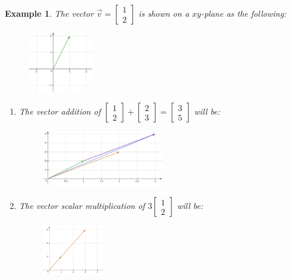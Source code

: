 \documentclass[12pt, a4paper]{article}
\newtheorem{eg}{Example}[subsection]
\begin{document}
\begin{eg}
The vector $\vec{v}=\begin{bmatrix}1\\2\end{bmatrix}$ is shown on a $xy$-plane as the following: 
\begin{figure}[H] 
\centering
\includegraphics[width=0.25\textwidth]{vector1.png}
\end{figure}
\begin{enumerate}
\item The vector addition of $\begin{bmatrix}1\\2\end{bmatrix}+\begin{bmatrix}2\\3\end{bmatrix}=\begin{bmatrix}3\\5\end{bmatrix}$ will be: 
\begin{figure}[H]
\centering
\includegraphics[width=0.5\textwidth]{vector addition.png} 
\end{figure}
\item The vector scalar multiplication of $3\begin{bmatrix}1\\2\end{bmatrix}$ will be: \begin{figure}[H] 
\centering 
\includegraphics[width=0.25\textwidth]{scalar multiplication.png} 
\end{figure}
\end{enumerate}
\end{eg}
\end{document}
